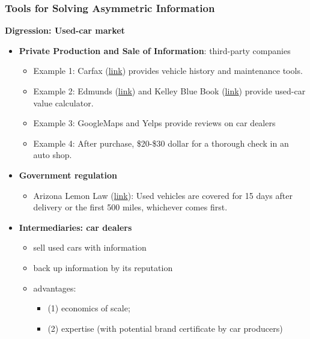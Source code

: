 \documentclass[aspectratio=169]{beamer}
\begin{document}
\begin{frame}
\frametitle{Tools for Solving Asymmetric Information}



\textbf{Digression: Used-car market}
\begin{itemize}
    \item \textbf{Private Production and Sale of Information}: third-party companies
    \begin{itemize}
        \item Example 1: Carfax (\href{https://www.carfax.com/}{link}) provides vehicle history and maintenance tools.
        \item Example 2: Edmunds (\href{https://www.edmunds.com/}{link}) and Kelley Blue Book (\href{https://www.kbb.com/whats-my-car-worth/}{link}) provide used-car value calculator.
        \item Example 3: GoogleMaps and Yelps provide reviews on car dealers
        \item Example 4: After purchase, \$20-\$30 dollar for a thorough check in an auto shop.
    \end{itemize}
    \item \textbf{Government regulation} 
    \begin{itemize}
        \item Arizona Lemon Law (\href{https://arizonalemonlaw.us/lemon-laws/}{link}): Used vehicles are covered for 15 days after delivery or the first 500 miles, whichever comes first.
    \end{itemize}
    \item \textbf{Intermediaries: car dealers} 
    \begin{itemize}
        \item sell used cars with information
        \item back up information by its reputation
        \item advantages: 
        \begin{itemize}
            \item (1) economics of scale;
            \item (2) expertise (with potential brand certificate by car producers)
        \end{itemize} 
    \end{itemize}
\end{itemize}



\end{frame}
\end{document}
